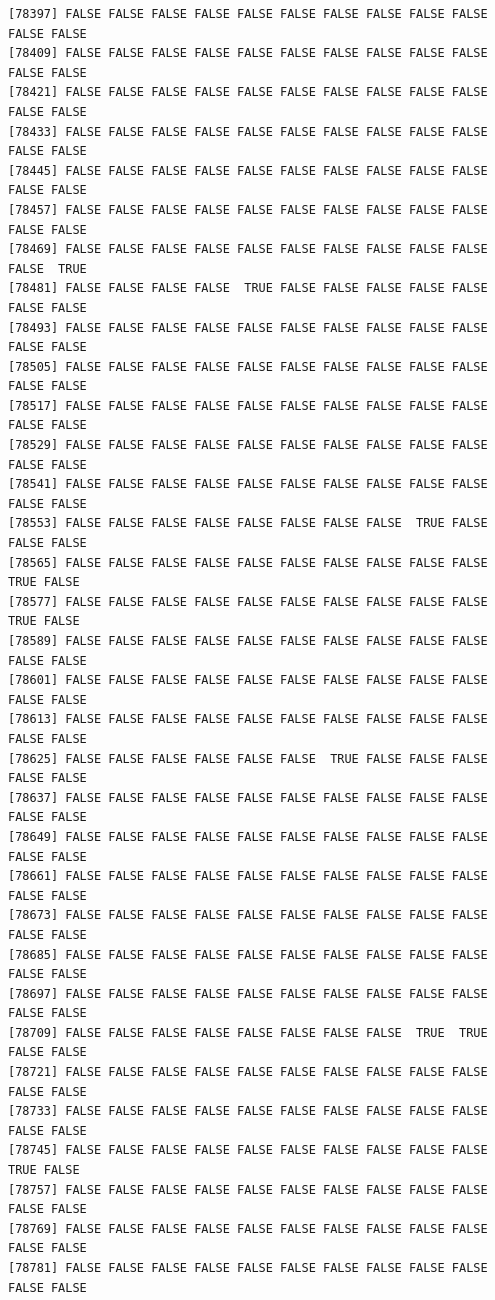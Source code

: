 \documentclass[
  a4paper,
  DIV=11,
  numbers=noendperiod]{scrartcl}
\begin{document}
\begin{verbatim}
[78397] FALSE FALSE FALSE FALSE FALSE FALSE FALSE FALSE FALSE FALSE FALSE FALSE
[78409] FALSE FALSE FALSE FALSE FALSE FALSE FALSE FALSE FALSE FALSE FALSE FALSE
[78421] FALSE FALSE FALSE FALSE FALSE FALSE FALSE FALSE FALSE FALSE FALSE FALSE
[78433] FALSE FALSE FALSE FALSE FALSE FALSE FALSE FALSE FALSE FALSE FALSE FALSE
[78445] FALSE FALSE FALSE FALSE FALSE FALSE FALSE FALSE FALSE FALSE FALSE FALSE
[78457] FALSE FALSE FALSE FALSE FALSE FALSE FALSE FALSE FALSE FALSE FALSE FALSE
[78469] FALSE FALSE FALSE FALSE FALSE FALSE FALSE FALSE FALSE FALSE FALSE  TRUE
[78481] FALSE FALSE FALSE FALSE  TRUE FALSE FALSE FALSE FALSE FALSE FALSE FALSE
[78493] FALSE FALSE FALSE FALSE FALSE FALSE FALSE FALSE FALSE FALSE FALSE FALSE
[78505] FALSE FALSE FALSE FALSE FALSE FALSE FALSE FALSE FALSE FALSE FALSE FALSE
[78517] FALSE FALSE FALSE FALSE FALSE FALSE FALSE FALSE FALSE FALSE FALSE FALSE
[78529] FALSE FALSE FALSE FALSE FALSE FALSE FALSE FALSE FALSE FALSE FALSE FALSE
[78541] FALSE FALSE FALSE FALSE FALSE FALSE FALSE FALSE FALSE FALSE FALSE FALSE
[78553] FALSE FALSE FALSE FALSE FALSE FALSE FALSE FALSE  TRUE FALSE FALSE FALSE
[78565] FALSE FALSE FALSE FALSE FALSE FALSE FALSE FALSE FALSE FALSE  TRUE FALSE
[78577] FALSE FALSE FALSE FALSE FALSE FALSE FALSE FALSE FALSE FALSE  TRUE FALSE
[78589] FALSE FALSE FALSE FALSE FALSE FALSE FALSE FALSE FALSE FALSE FALSE FALSE
[78601] FALSE FALSE FALSE FALSE FALSE FALSE FALSE FALSE FALSE FALSE FALSE FALSE
[78613] FALSE FALSE FALSE FALSE FALSE FALSE FALSE FALSE FALSE FALSE FALSE FALSE
[78625] FALSE FALSE FALSE FALSE FALSE FALSE  TRUE FALSE FALSE FALSE FALSE FALSE
[78637] FALSE FALSE FALSE FALSE FALSE FALSE FALSE FALSE FALSE FALSE FALSE FALSE
[78649] FALSE FALSE FALSE FALSE FALSE FALSE FALSE FALSE FALSE FALSE FALSE FALSE
[78661] FALSE FALSE FALSE FALSE FALSE FALSE FALSE FALSE FALSE FALSE FALSE FALSE
[78673] FALSE FALSE FALSE FALSE FALSE FALSE FALSE FALSE FALSE FALSE FALSE FALSE
[78685] FALSE FALSE FALSE FALSE FALSE FALSE FALSE FALSE FALSE FALSE FALSE FALSE
[78697] FALSE FALSE FALSE FALSE FALSE FALSE FALSE FALSE FALSE FALSE FALSE FALSE
[78709] FALSE FALSE FALSE FALSE FALSE FALSE FALSE FALSE  TRUE  TRUE FALSE FALSE
[78721] FALSE FALSE FALSE FALSE FALSE FALSE FALSE FALSE FALSE FALSE FALSE FALSE
[78733] FALSE FALSE FALSE FALSE FALSE FALSE FALSE FALSE FALSE FALSE FALSE FALSE
[78745] FALSE FALSE FALSE FALSE FALSE FALSE FALSE FALSE FALSE FALSE  TRUE FALSE
[78757] FALSE FALSE FALSE FALSE FALSE FALSE FALSE FALSE FALSE FALSE FALSE FALSE
[78769] FALSE FALSE FALSE FALSE FALSE FALSE FALSE FALSE FALSE FALSE FALSE FALSE
[78781] FALSE FALSE FALSE FALSE FALSE FALSE FALSE FALSE FALSE FALSE FALSE FALSE

\end{verbatim}
\end{document}
